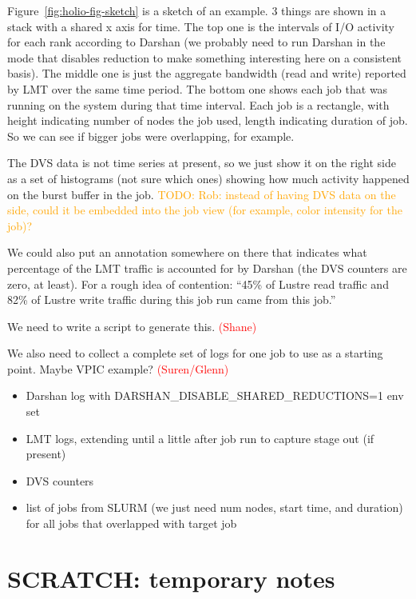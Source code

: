 \documentclass[conference,10pt,compsocconf]{IEEEtran}
\newcommand{\assign}[1]{\textcolor{red}{(#1)}}
\newcommand{\todo}[1]{\textcolor{Orange}{TODO: #1}}
\begin{document}
Figure~\ref{fig:holio-fig-sketch} is a sketch of an example.  3 things
are shown in a stack with a shared x axis for time.  The top one is
the intervals of I/O activity for each rank according to Darshan (we probably
need to run Darshan in the mode that disables reduction to make something
interesting here on a consistent basis).  The middle one is just the
aggregate bandwidth (read and write) reported by LMT over the same time
period.  The bottom one shows each job that was running on the system during
that time interval.  Each job is a rectangle, with height indicating number
of nodes the job used, length indicating duration of job.  So we can see if
bigger jobs were overlapping, for example.

The DVS data is not time series at present, so we just show it on the right
side as a set of histograms (not sure which ones) showing how much activity
happened on the burst buffer in the job.
\todo{Rob: instead of having DVS data on the side, could it be embedded into the
job view (for example, color intensity for the job)?}

We could also put an annotation somewhere on there that indicates what
percentage of the LMT traffic is accounted for by Darshan (the DVS counters
are zero, at least).  For a rough idea of contention: ``45\% of Lustre read
traffic and 82\% of Lustre write traffic during this job run came from this
job.''

We need to write a script to generate this. \assign{Shane}

We also need to collect a complete set of logs for one job to use as a
starting point.  Maybe VPIC example? \assign{Suren/Glenn}
\begin{itemize}
\item Darshan log with DARSHAN\_DISABLE\_SHARED\_REDUCTIONS=1 env set
\item LMT logs, extending until a little after job run to capture stage out
(if present)
\item DVS counters
\item list of jobs from SLURM (we just need num nodes, start time, and
duration) for all jobs that overlapped with target job
\end{itemize}

\section{SCRATCH: temporary notes}
\end{document}
